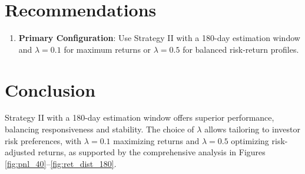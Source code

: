 \documentclass[12pt]{article}
\begin{document}
\section{Recommendations}
\begin{enumerate}
    \item \textbf{Primary Configuration}: Use Strategy II with a 180-day estimation window and $\lambda=0.1$ for maximum returns or $\lambda=0.5$ for balanced risk-return profiles.

\end{enumerate}

\section{Conclusion}
Strategy II with a 180-day estimation window offers superior performance, balancing responsiveness and stability. The choice of $\lambda$ allows tailoring to investor risk preferences, with $\lambda=0.1$ maximizing returns and $\lambda=0.5$ optimizing risk-adjusted returns, as supported by the comprehensive analysis in Figures \ref{fig:pnl_40}--\ref{fig:ret_dist_180}.

\newpage

\appendix
\end{document}
